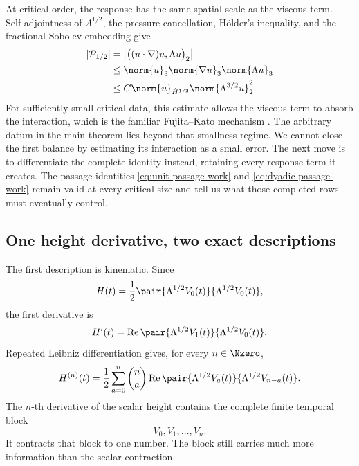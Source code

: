 At critical order, the response has the same spatial scale as the viscous
term.  Self-adjointness of \(\Lambda^{1/2}\), the pressure cancellation,
H\"older's inequality, and the fractional Sobolev embedding give
\begin{align}
 |\mathcal P_{1/2}|
 &=\left|\bigl((u\cdot\nabla)u,\Lambda u\bigr)_2\right|
 \notag\\
 &\le\norm{u}_3\norm{\nabla u}_3\norm{\Lambda u}_3
 \notag\\
 &\le C\norm{u}_{\dot H^{1/2}}
          \norm{\Lambda^{3/2}u}_2^2.
 \label{eq:critical-response-estimate}
\end{align}
For sufficiently small critical data, this estimate allows the viscous term
to absorb the interaction, which is the familiar Fujita--Kato mechanism
.  The arbitrary datum in the main theorem lies beyond
that smallness regime.  We cannot close the first balance by estimating its
interaction as a small error.  The next move is to differentiate the complete
identity instead, retaining every response term it creates.  The passage
identities \eqref{eq:unit-passage-work} and
\eqref{eq:dyadic-passage-work} remain valid at every critical size and tell us
what those completed rows must eventually control.

\subsection{One height derivative, two exact descriptions}

The first description is kinematic.  Since
\begin{equation*}
 H(t)=\frac12
 \pair{\Lambda^{1/2}V_0(t)}{\Lambda^{1/2}V_0(t)},
\end{equation*}
the first derivative is
\begin{equation*}
 H'(t)=\operatorname{Re}
 \pair{\Lambda^{1/2}V_1(t)}{\Lambda^{1/2}V_0(t)}.
\end{equation*}
Repeated Leibniz differentiation gives, for every \(n\in\Nzero\),
\begin{equation}
 H^{(n)}(t)
 =\frac12\sum_{a=0}^n\binom na
 \operatorname{Re}
 \pair{\Lambda^{1/2}V_a(t)}
 {\Lambda^{1/2}V_{n-a}(t)}.
 \label{eq:height-temporal-contraction}
\end{equation}
The \(n\)-th derivative of the scalar height contains the complete finite
temporal block
\begin{equation*}
 V_0,V_1,\ldots,V_n.
\end{equation*}
It contracts that block to one number.  The block still carries much more
information than the scalar contraction.

